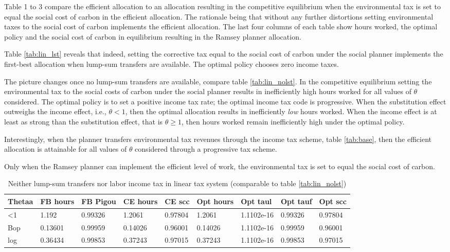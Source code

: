 Table 1 to 3 compare the efficient allocation to an allocation resulting in the competitive equilibrium when the environmental tax is set to equal the social cost of carbon in the efficient allocation. The rationale being that without any further distortions setting environmental taxes to the social cost of carbon implements the efficient allocation. The last four columns of each table show hours worked, the optimal policy and the social cost of carbon in equilibrium resulting in the Ramsey planner allocation. 

Table \ref{tab:lin_lst} reveals that indeed, setting the corrective tax equal to the social cost of carbon under the social planner implements the first-best allocation when lump-sum transfers are available. The optimal policy chooses zero income taxes. 

The picture changes once no lump-sum transfers are available, compare table \ref{tab:lin_nolst}. In the competitive equilibrium setting the environmental tax to the social costs of carbon under the social planner results in inefficiently high hours worked for all values of $\theta$ considered. The optimal policy is to set a positive income tax rate; the optimal income tax code is progressive. When the substitution effect outweighs the income effect, i.e., $\theta<1$, then the optimal allocation results in inefficiently \textit{low} hours worked. When the income effect is at least as strong than the substitution effect, that is $\theta\geq 1$, then hours worked remain inefficiently high under the optimal policy. 

Interestingly, when the planner transfers environmental tax revenues through the income tax scheme, table \ref{tab:base}, then the efficient allocation is attainable for all values of $\theta$ considered through a progressive tax scheme. 

Only when the Ramsey planner can implement the efficient level of work, the environmental tax is set to equal the social cost of carbon.   

\begin{table}
	\caption{Neither lump-sum transfers nor labor income tax in linear tax system (comparable to table \ref{tab:lin_nolst})}\label{tab:lin_nolst_notaul}
\begin{tabular}{lllllllll}
	Thetaa & FB hours & FB Pigou & CE hours & CE scc & Opt hours & Opt taul & Opt tauf & Opt scc \\ 
	\hline 
	<1 & 1.192 & 0.99326 & 1.2061 & 0.97804 & 1.2061 & 1.1102e-16 & 0.99326 & 0.97804 \\ 
	Bop & 0.13601 & 0.99959 & 0.14026 & 0.96001 & 0.14026 & 1.1102e-16 & 0.99959 & 0.96001 \\ 
	log & 0.36434 & 0.99853 & 0.37243 & 0.97015 & 0.37243 & 1.1102e-16 & 0.99853 & 0.97015 \\ 
	\hline 
\end{tabular}
\end{table}


